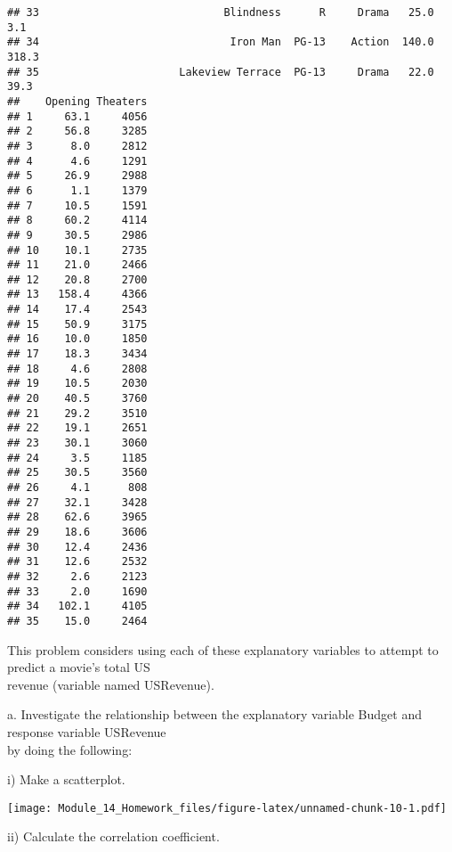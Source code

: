 \documentclass[
]{article}
\newenvironment{Shaded}{\begin{snugshade}}{\end{snugshade}}
\newcommand{\AttributeTok}[1]{\textcolor[rgb]{0.13,0.29,0.53}{#1}}
\newcommand{\FunctionTok}[1]{\textcolor[rgb]{0.13,0.29,0.53}{\textbf{#1}}}
\newcommand{\NormalTok}[1]{#1}
\newcommand{\SpecialCharTok}[1]{\textcolor[rgb]{0.81,0.36,0.00}{\textbf{#1}}}
\begin{document}
\begin{verbatim}
## 33                             Blindness      R     Drama   25.0       3.1
## 34                              Iron Man  PG-13    Action  140.0     318.3
## 35                      Lakeview Terrace  PG-13     Drama   22.0      39.3
##    Opening Theaters
## 1     63.1     4056
## 2     56.8     3285
## 3      8.0     2812
## 4      4.6     1291
## 5     26.9     2988
## 6      1.1     1379
## 7     10.5     1591
## 8     60.2     4114
## 9     30.5     2986
## 10    10.1     2735
## 11    21.0     2466
## 12    20.8     2700
## 13   158.4     4366
## 14    17.4     2543
## 15    50.9     3175
## 16    10.0     1850
## 17    18.3     3434
## 18     4.6     2808
## 19    10.5     2030
## 20    40.5     3760
## 21    29.2     3510
## 22    19.1     2651
## 23    30.1     3060
## 24     3.5     1185
## 25    30.5     3560
## 26     4.1      808
## 27    32.1     3428
## 28    62.6     3965
## 29    18.6     3606
## 30    12.4     2436
## 31    12.6     2532
## 32     2.6     2123
## 33     2.0     1690
## 34   102.1     4105
## 35    15.0     2464
\end{verbatim}

This problem considers using each of these explanatory variables to
attempt to predict a movie's total US\\
revenue (variable named USRevenue).

\hfill\break
a. Investigate the relationship between the explanatory variable Budget
and response variable USRevenue\\
by doing the following:

\hfill\break
i) Make a scatterplot.

\begin{Shaded}
\end{Shaded}

\texttt{[image: Module\_14\_Homework\_files/figure-latex/unnamed-chunk-10-1.pdf]}

\hfill\break
ii) Calculate the correlation coefficient.

\begin{Shaded}
\end{Shaded}
\end{document}
